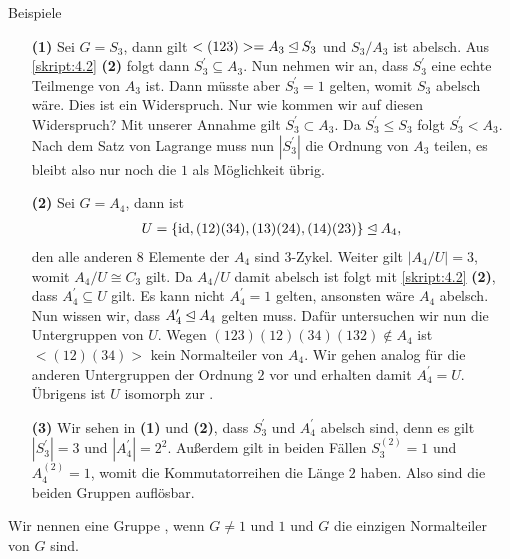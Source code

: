 \begin{genericdf}{Beispiele} \label{skript:4.6} \ 
	\begin{enumerate}
		\item[\textbf{(1)}]
		Sei $ G=S_3 $, dann gilt $ <(123)> = A_3 \unlhd S_3$ und $ S_3  / A_3$ ist abelsch.
	    Aus \ref{skript:4.2} \textbf{(2)} folgt dann $ S_3^\prime  \subseteq A_3 $.
	    Nun nehmen wir an, dass $ S_3^\prime $ eine echte Teilmenge von $ A_3 $ ist.
	    Dann müsste aber $ S_3^\prime = 1 $ gelten, womit $ S_3 $ abelsch wäre. Dies ist ein Widerspruch.
	    Nur wie kommen wir auf diesen Widerspruch? Mit unserer Annahme gilt $ S_3^\prime \subset A_3 $.
	    Da $ S_3^\prime \leq S_3 $ folgt $ S_3^\prime < A_3 $. Nach dem Satz von Lagrange muss nun $ |S_3^\prime|  $ die Ordnung von $ A_3 $ teilen, es bleibt also nur noch die $ 1 $ als Möglichkeit übrig.
	    \item[\textbf{(2)}] 
	    Sei $ G= A_4 $, dann ist
		\begin{align*}
		U = \lbrace \operatorname{id}, (12)(34), (13)(24), (14)(23) \rbrace \unlhd A_4,
		\end{align*}
		den alle anderen $ 8 $ Elemente der $ A_4 $ sind $ 3 $-Zykel.
		Weiter gilt $ |A_4/U| = 3 $, womit $ A_4/U \cong C_3 $ gilt. Da $ A_4/U $ damit abelsch ist folgt mit \ref{skript:4.2} \textbf{(2)}, dass $ A_4^\prime \subseteq  U$ gilt.
		Es kann nicht $ A_4^\prime = 1 $ gelten, ansonsten wäre $ A_4 $ abelsch. 
		Nun wissen wir, dass $ A_4^\prime \unlhd A_4 $ gelten muss. Dafür untersuchen wir nun die Untergruppen von $ U $.
		Wegen $ (123)(12)(34)(132) \notin A_4 $ ist $ <(12)(34)>  $ kein Normalteiler von $ A_4 $. Wir gehen analog für die anderen Untergruppen der Ordnung $ 2 $ vor und erhalten damit $ A_4^\prime = U $.
		Übrigens ist $ U $ isomorph zur . 
		\item[\textbf{(3)}] 
		Wir sehen in \textbf{(1)} und \textbf{(2)}, dass $ S_3^\prime $ und $ A_4^\prime $ abelsch sind, denn es gilt
		$ |S_3^\prime |= 3 $ und $ |A_4^\prime | = 2^2 $. Außerdem gilt in beiden Fällen $ S_3^{(2)} = 1 $ und $ A_4^{(2)} =1  $, womit die Kommutatorreihen die Länge $ 2 $ haben. Also sind die beiden Gruppen auflösbar.
  	\end{enumerate}
\end{genericdf}

\begin{df} \label{skript:4.7}  
	Wir nennen eine Gruppe , wenn $ G \neq 1 $ und $ 1 $ und $ G $ die einzigen Normalteiler von $ G $ sind.
\end{df}

